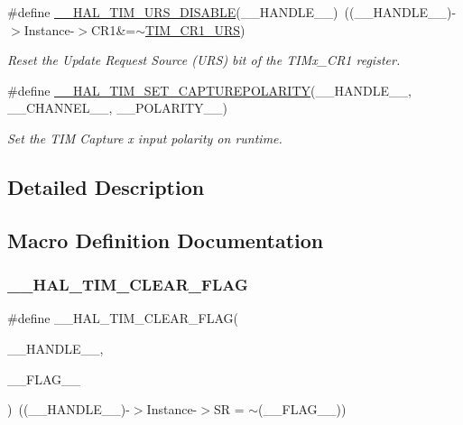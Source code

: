 \begin{DoxyCompactItemize}
\#define \mbox{\hyperlink{group___t_i_m___exported___macros_gafacb551a4c537e62a0fe740b2f12236c}{\+\_\+\+\_\+\+H\+A\+L\+\_\+\+T\+I\+M\+\_\+\+U\+R\+S\+\_\+\+D\+I\+S\+A\+B\+LE}}(\+\_\+\+\_\+\+H\+A\+N\+D\+L\+E\+\_\+\+\_\+)~((\+\_\+\+\_\+\+H\+A\+N\+D\+L\+E\+\_\+\+\_\+)-\/$>$Instance-\/$>$C\+R1\&=$\sim$\mbox{\hyperlink{group___peripheral___registers___bits___definition_ga06c997c2c23e8bef7ca07579762c113b}{T\+I\+M\+\_\+\+C\+R1\+\_\+\+U\+RS}})
\begin{DoxyCompactList}\small\item\em Reset the Update Request Source (U\+RS) bit of the T\+I\+Mx\+\_\+\+C\+R1 register. \end{DoxyCompactList}\item 
\#define \mbox{\hyperlink{group___t_i_m___exported___macros_gac5d6989516caa67fae23a9329228cdc7}{\+\_\+\+\_\+\+H\+A\+L\+\_\+\+T\+I\+M\+\_\+\+S\+E\+T\+\_\+\+C\+A\+P\+T\+U\+R\+E\+P\+O\+L\+A\+R\+I\+TY}}(\+\_\+\+\_\+\+H\+A\+N\+D\+L\+E\+\_\+\+\_\+,  \+\_\+\+\_\+\+C\+H\+A\+N\+N\+E\+L\+\_\+\+\_\+,  \+\_\+\+\_\+\+P\+O\+L\+A\+R\+I\+T\+Y\+\_\+\+\_\+)
\begin{DoxyCompactList}\small\item\em Set the T\+IM Capture x input polarity on runtime. \end{DoxyCompactList}\end{DoxyCompactItemize}


\subsection{Detailed Description}


\subsection{Macro Definition Documentation}
\mbox{\label{group___t_i_m___exported___macros_ga2fe74db6b8cb4badd04ed48e0f5ac7b4}} 
\subsubsection{\texorpdfstring{\_\_HAL\_TIM\_CLEAR\_FLAG}{\_\_HAL\_TIM\_CLEAR\_FLAG}}
{\footnotesize\ttfamily \#define \+\_\+\+\_\+\+H\+A\+L\+\_\+\+T\+I\+M\+\_\+\+C\+L\+E\+A\+R\+\_\+\+F\+L\+AG(\begin{DoxyParamCaption}\item[{}]{\+\_\+\+\_\+\+H\+A\+N\+D\+L\+E\+\_\+\+\_\+,  }\item[{}]{\+\_\+\+\_\+\+F\+L\+A\+G\+\_\+\+\_\+ }\end{DoxyParamCaption})~((\+\_\+\+\_\+\+H\+A\+N\+D\+L\+E\+\_\+\+\_\+)-\/$>$Instance-\/$>$SR = $\sim$(\+\_\+\+\_\+\+F\+L\+A\+G\+\_\+\+\_\+))}



